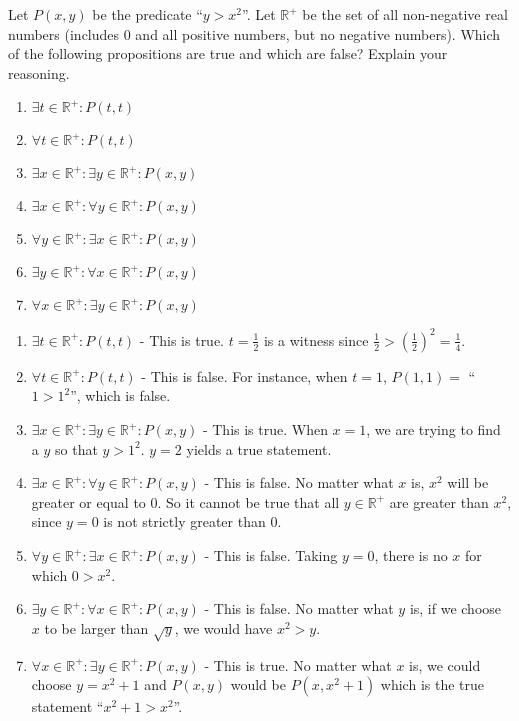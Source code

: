 \begin{xca}
	Let $P(x,y)$ be the predicate ``$y >  x^2$''. Let $\mathbb{R}^+$ be the set of all non-negative real numbers (includes $0$ and all positive numbers, but no negative numbers).  Which of the following propositions are true and which are false?  Explain your reasoning.
	
	\begin{enumerate}
			\item $\exists t \in \mathbb{R}^+: P(t,t)$
			\item $\forall t \in \mathbb{R}^+: P(t,t)$
			\item$\exists x \in \mathbb{R}^+: \exists y\in \mathbb{R}^+: P(x,y)$
			\item $\exists x \in \mathbb{R}^+: \forall y \in \mathbb{R}^+: P(x,y)$
			\item $\forall y \in \mathbb{R}^+: \exists x \in \mathbb{R}^+: P(x,y)$
			\item $\exists y \in \mathbb{R}^+: \forall x \in \mathbb{R}^+: P(x,y)$
			\item $\forall x \in \mathbb{R}^+: \exists y \in \mathbb{R}^+: P(x,y)$
		\end{enumerate}
	\end{xca}

\begin{solutions}
			\begin{enumerate}
			\item $\exists t \in \mathbb{R}^+: P(t,t)$ - This is true.   $t = \frac{1}{2}$ is a witness since $\frac{1}{2} > (\frac{1}{2})^2  =\frac{1}{4}$.
			\item $\forall t \in \mathbb{R}^+: P(t,t)$ - This is false.  For instance, when $ t= 1$, $P(1,1) = $ ``$1 > 1^2$'', which is false.  
			\item$\exists x \in \mathbb{R}^+: \exists y\in \mathbb{R}^+: P(x,y)$ - This is true.  When $x = 1$, we are trying to find a $y$ so that $y > 1^2$.  $y = 2$ yields a true statement.
			\item $\exists x \in \mathbb{R}^+: \forall y \in \mathbb{R}^+: P(x,y)$ - This is false.  No matter what $x$ is, $x^2$ will be greater or equal to $0$.  So it cannot be true that all $y \in \mathbb{R}^+$ are greater than $x^2$, since $y = 0$ is not strictly greater than $0$.
			\item $\forall y \in \mathbb{R}^+: \exists x \in \mathbb{R}^+: P(x,y)$ - This is false.  Taking $y=0$, there is no $x$ for which $0>x^2$.
			\item $\exists y \in \mathbb{R}^+: \forall x \in \mathbb{R}^+: P(x,y)$ - This is false.  No matter what $y$ is, if we choose $x$ to be larger than $\sqrt{y}$, we would have $x^2 > y$.
			\item $\forall x \in \mathbb{R}^+: \exists y \in \mathbb{R}^+: P(x,y)$ - This is true.  No matter what $x$ is, we could choose $y = x^2+1$ and $P(x,y)$ would be $P(x,x^2+1)$ which is the true statement ``$x^2+1 > x^2$''.
		\end{enumerate}
	\end{solutions}


